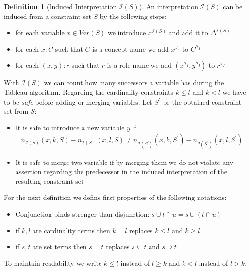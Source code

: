 \documentclass[a4paper,11pt]{scrartcl}
\theoremstyle{break}
\theoremstyle{definition}
\newtheorem{mydef}{Definition}
\begin{document}
\begin{mydef}[Induced Interpretation $\mathcal{I}(S)$]
An interpretation $\mathcal{I}(S)$ can be induced from a constraint set $S$ by the following steps:
\begin{itemize}
\item for each variable $x\in Var(S)$ we introduce $x^{\mathcal{I}(S)}$ and add it to $\Delta^{\mathcal{I}(S)}$
\item for each $x:C$ such that $C$ is a concept name we add $x^{\mathcal{I}_I}$ to $C^{\mathcal{I}_I}$
\item for each $(x,y):r$ such that $r$ is a role name we add $(x^{\mathcal{I}_I},y^{\mathcal{I}_I})$ to $r^{\mathcal{I}_I}$
\end{itemize}
With $\mathcal{I}(S)$ we can count how many successors a variable has during the Tableau-algorithm. Regarding the cardinality constraints $k\leq l$ and $k<l$ we have to be \textit{safe} before adding or merging variables. Let $S^\prime$ be the obtained constraint set from $S$:
\begin{itemize}
\item It is safe to introduce a new variable $y$ if\begin{align*}
n_{\mathcal{I}(S)}(x,k,S)-n_{\mathcal{I}(S)}(x,l,S)\neq n_{\mathcal{I}(S^\prime)}(x,k,S^\prime)-n_{\mathcal{I}(S^\prime)}(x,l,S^\prime)
\end{align*} 
\item It is safe to merge two variable if by merging them we do not violate any assertion regarding the predecessor in the induced interpretation of the resulting constraint set
\end{itemize}
For the next definition we define first properties of the following notations:
\begin{itemize}
\item Conjunction binds stronger than disjunction: $s\cup t\cap u = s\cup (t\cap u)$
\item if $k,l$ are cardinality terms then $k=l$ replaces $k\leq l$ and $k\geq l$ 
\item if $s,t$ are set terms then $s=t$ replaces $s\subseteq t$ and $s\supseteq t$
\end{itemize}
To maintain readability we write $k\leq l$ instead of $l\geq k$ and $k<l$ instead of $l>k$.
\end{mydef}
\end{document}

